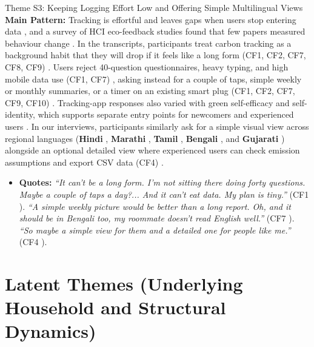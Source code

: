 \documentclass[12pt, a4paper]{article}
\begin{document}
\begin{semanticcard}{Theme S3: Keeping Logging Effort Low and Offering Simple Multilingual Views}
\textbf{Main Pattern:} Tracking is effortful and leaves gaps when users stop entering data \cite{hoffmann2024}, and a survey of HCI eco-feedback studies found that few papers measured behaviour change \cite{froehlich2010}. In the transcripts, participants treat carbon tracking as a background habit that they will drop if it feels like a long form (CF1, CF2, CF7, CF8, CF9) \cite{cf1, cf2, cf7, cf8, cf9}. Users reject 40-question questionnaires, heavy typing, and high mobile data use (CF1, CF7) \cite{cf1, cf7}, asking instead for a couple of taps, simple weekly or monthly summaries, or a timer on an existing smart plug (CF1, CF2, CF7, CF9, CF10) \cite{cf1, cf2, cf7, cf9, cf10}. Tracking-app responses also varied with green self-efficacy and self-identity, which supports separate entry points for newcomers and experienced users \cite{hoffmann2024}. In our interviews, participants similarly ask for a simple visual view across regional languages (\textbf{Hindi} \cite{cf1, cf3, cf4, cf8}, \textbf{Marathi} \cite{cf1}, \textbf{Tamil} \cite{cf4}, \textbf{Bengali} \cite{cf7}, and \textbf{Gujarati} \cite{cf10}) alongside an optional detailed view where experienced users can check emission assumptions and export CSV data (CF4) \cite{cf4}.
\begin{itemize}
    \item \textbf{Quotes:} \textit{``It can't be a long form. I'm not sitting there doing forty questions. Maybe a couple of taps a day?... And it can't eat data. My plan is tiny.''} (CF1 \cite{cf1}). \textit{``A simple weekly picture would be better than a long report. Oh, and it should be in Bengali too, my roommate doesn't read English well.''} (CF7 \cite{cf7}). \textit{``So maybe a simple view for them and a detailed one for people like me.''} (CF4 \cite{cf4}).
\end{itemize}
\end{semanticcard}

\section{Latent Themes (Underlying Household and Structural Dynamics)}
\end{document}
